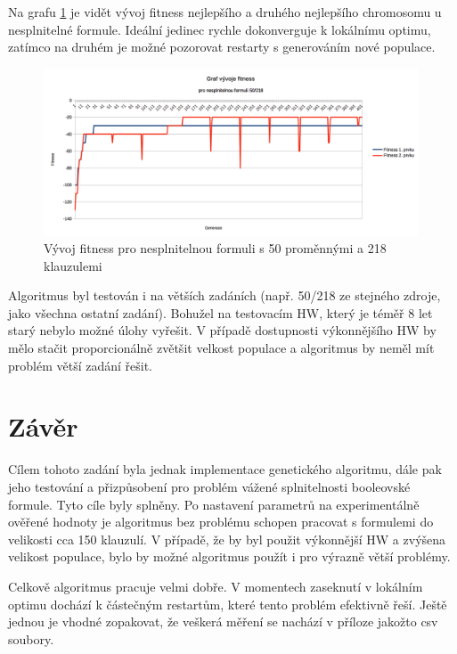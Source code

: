 \documentclass[a4paper]{article}
\begin{document}
	Na grafu \ref{graf-nesplnitelna} je vidět vývoj fitness nejlepšího a druhého nejlepšího chromosomu u nesplnitelné formule. Ideální jedinec rychle dokonverguje k lokálnímu optimu, zatímco na druhém je možné pozorovat restarty s generováním nové populace.
	
	\begin{figure}[h]\centering
		\includegraphics[width=0.99\textwidth]{graf-vyvoj-nesplnitelna.png} 
		\caption{Vývoj fitness pro nesplnitelnou formuli s 50 proměnnými a 218 klauzulemi}
		\label{graf-nesplnitelna}
	\end{figure}

	Algoritmus byl testován i na větších zadáních (např. 50/218 ze stejného zdroje, jako všechna ostatní zadání). Bohužel na testovacím HW, který je téměř 8 let starý nebylo možné úlohy vyřešit. V případě dostupnosti výkonnějšího HW by mělo stačit proporcionálně zvětšit velkost populace a algoritmus by neměl mít problém větší zadání řešit.
	
\section{Závěr}
	Cílem tohoto zadání byla jednak implementace genetického algoritmu, dále pak jeho testování a přizpůsobení pro problém vážené splnitelnosti booleovské formule. Tyto cíle byly splněny. Po nastavení parametrů na experimentálně ověřené hodnoty je algoritmus bez problému schopen pracovat s formulemi do velikosti cca 150 klauzulí. V případě, že by byl použit výkonnější HW a zvýšena velikost populace, bylo by možné algoritmus použít i pro výrazně větší problémy.
	
	Celkově algoritmus pracuje velmi dobře. V momentech zaseknutí v lokálním optimu dochází k částečným restartům, které tento problém efektivně řeší. Ještě jednou je vhodné zopakovat, že veškerá měření se nachází v příloze jakožto csv soubory.
	
\end{document}
